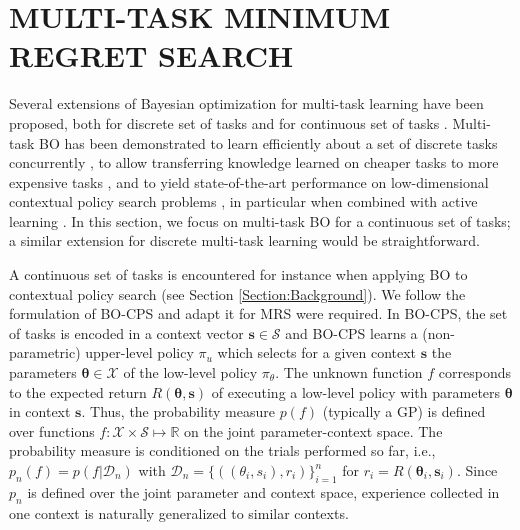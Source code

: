 \documentclass[10pt,letterpaper]{article} %
\begin{document}
\section{MULTI-TASK MINIMUM REGRET SEARCH} \label{Section:CMRS}


Several extensions of Bayesian optimization for multi-task learning have been
proposed, both for discrete set of tasks \citep{krause_contextual_2011}
and for continuous set of tasks
\cite{metzen_active_2015}. Multi-task BO has been demonstrated to learn
efficiently about a set of discrete tasks concurrently
\cite{krause_contextual_2011}, to allow transferring knowledge learned on
cheaper tasks to more expensive tasks \cite{swersky_multi-task_2013}, and to
yield state-of-the-art performance on low-dimensional contextual policy search
problems \cite{metzen_bayesian_2015}, in particular when combined with active
learning \cite{metzen_active_2015}. In this section, we focus on multi-task BO
for a continuous set of tasks; a similar extension for discrete multi-task
learning would be straightforward.

A continuous set of tasks is encountered for instance when applying BO to
contextual policy search (see Section \ref{Section:Background}). We follow the
formulation of BO-CPS \cite{metzen_bayesian_2015} and adapt it for MRS were
required. In BO-CPS, the set of tasks is encoded in a context vector $\mathbf{s}
\in \mathcal{S}$ and BO-CPS learns a (non-parametric) upper-level policy $\pi_{u}$
which selects for a given context $\mathbf{s}$ the parameters $\mathbf{\theta}
\in \mathcal{X}$ of the low-level policy $\pi_\theta$. The unknown function $f$
corresponds to the expected return $R(\mathbf{\theta}, \mathbf{s})$ of executing
a low-level policy with parameters $\mathbf{\theta}$ in context $\mathbf{s}$.
Thus, the probability measure $p(f)$ (typically a GP) is defined over functions
$f: \mathcal{X} \times \mathcal{S} \mapsto \mathbb{R}$ on the joint
parameter-context space. The probability measure is conditioned on the trials performed so
far, i.e., $p_n(f) = p(f \vert \mathcal{D}_n)$ with $\mathcal{D}_n =
\{((\theta_i, s_i), r_i)\}_{i=1}^n$ for $r_i = R(\mathbf{\theta}_i, \mathbf{s}_i)$. Since $p_n$ is defined over the joint
parameter and context space, experience collected in one context is naturally
generalized to similar contexts.
\end{document}
